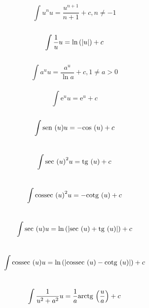 \documentclass{article}
\begin{document}
    $$ \int{u^n}{u} = \dfrac{u^{n+1}}{n+1} + c, n \neq -1$$ \\
    $$ \int{\dfrac{1}{u}}{u} = \ln {\abs u} +c$$ \\
    $$ \int{a^u}{u} = \dfrac{a^u}{\ln a} +c, 1 \neq a > 0$$ \\
    $$ \int{\mathrm{e}^u}{u} = \mathrm{e}^u +c$$ \\
    $$ \int{\mathrm{sen}\, \left( u \right)}{u} = -\mathrm{cos}\, \left( u \right)+c$$ \\
    $$ \int{\mathrm{sec}\, \left( u \right)^2}{u} = \mathrm{tg}\,\left( u \right) + c$$ \\
    $$ \int{\mathrm{cossec}\, \left( u \right)^2}{u}= -\mathrm{cotg}\, \left( u \right) +c$$ \\
    $$ \int{\sec u}{u}= \ln { \abs{\sec u + \tg u } } +c$$ \\
    $$ \int{\cossec u}{u}= \ln {\abs{\cossec u - \cotg u}} +c$$ \\
    $$ \int{\dfrac{1}{u^2 + a^2}}{u} = \dfrac{1}{a} \mathrm{arctg}\, \left( \dfrac{u}{a} \right)+c$$ \\
\end{document}
